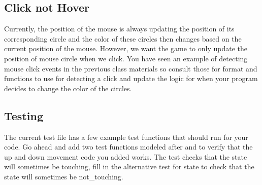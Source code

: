 \documentclass{tufte-handout}
\begin{document}
\subsection{Click not Hover}

Currently, the position of the mouse is always updating the position of its
corresponding circle and the color of these circles then changes based on
the current position of the mouse. However, we want the game to only update
the position of mouse circle when we click. You have seen an example of
detecting mouse click events in the previous class materials so consult those
for format and functions to use for detecting a click and update the logic for
when your program decides to change the color of the circles.

\subsection{Testing}

The current test file has a few example test functions that should run for
your code. Go ahead and add two test functions modeled after
 and  to
verify that the up and down movement code you added works. The test
 checks that the state will sometimes be
touching, fill in the alternative test for state
 to check that the state will sometimes be
not\_touching.
\end{document}
